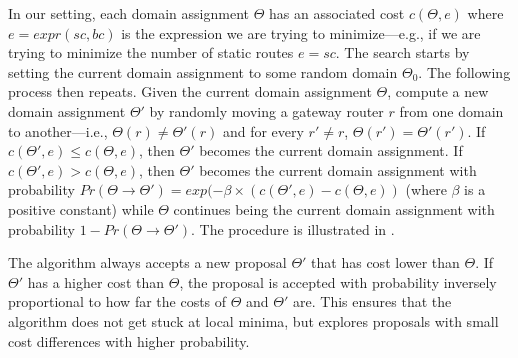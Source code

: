 In our setting, each domain assignment $\Theta$
has an associated cost $c(\Theta, e)$
where
$e=expr(sc, bc)$
is the expression we are trying to minimize---e.g., 
if we are trying to minimize the number of static routes $e=sc$.
The search starts by setting the current domain assignment 
to some random domain $\Theta_0$.
The following process then repeats.
Given the current domain
assignment $\Theta$, 
compute a new domain assignment $\Theta'$ by randomly
moving a gateway 
router $r$ from one domain to another---i.e., $\Theta(r){\neq}\Theta'(r)$ and
for every $r'{\neq} r$, $\Theta(r'){=}\Theta'(r')$.
If $c(\Theta',e)\leq c(\Theta,e)$, then $\Theta'$ becomes the current domain assignment.
If $c(\Theta',e)>c(\Theta,e)$, then $\Theta'$ becomes the current domain assignment
with probability $Pr(\Theta \rightarrow \Theta')= exp(-\beta\times(c(\Theta',e) - c(\Theta,e))$ (where $\beta$ is a positive constant) 
while 
 $\Theta$ continues being the current domain assignment with probability $1-Pr(\Theta \rightarrow \Theta')$.
\iffull
The procedure is illustrated in .
\fi

The algorithm always accepts a new proposal $\Theta'$
that has cost lower than $\Theta$. If $\Theta'$ has a 
higher cost than $\Theta$, the proposal is
accepted with probability inversely proportional to
how far the costs of $\Theta$ and $\Theta'$ are. This ensures that 
the algorithm does not get stuck at local minima, but 
explores proposals with small cost differences with 
higher probability.


